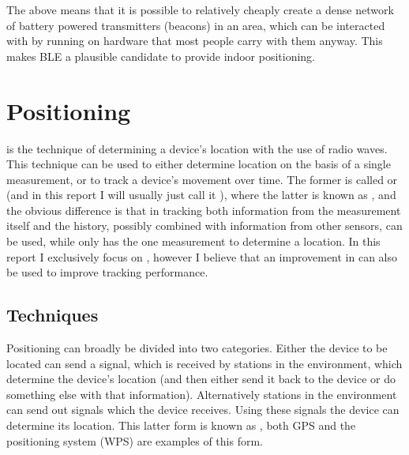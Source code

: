 The above means that it is possible to relatively cheaply create a dense network of battery powered \BLE transmitters (beacons) in an area, which can be interacted with by \apps running on hardware that most people carry with them anyway.
This makes BLE a plausible candidate to provide indoor positioning.

\section{Positioning}
 is the technique of determining a device's location with the use of radio waves.
This technique can be used to either determine location on the basis of a single measurement, or to track a device's movement over time.
The former is called  or  (and in this report I will usually just call it ), where the latter is known as , and the obvious difference is that in tracking both information from the measurement itself and the history, possibly combined with information from other sensors, can be used, while \ptfp only has the one measurement to determine a location.
In this report I exclusively focus on \ptfp, however I believe that an improvement in \ptfp can also be used to improve tracking performance.

\subsection{Techniques}
Positioning can broadly be divided into two categories.
Either the device to be located can send a signal, which is received by stations in the environment, which determine the device's location (and then either send it back to the device or do something else with that information).
Alternatively stations in the environment can send out signals which the device receives.
Using these signals the device can determine its location.
This latter form is known as , both GPS and the \wifi positioning system (WPS) are examples of this form.

